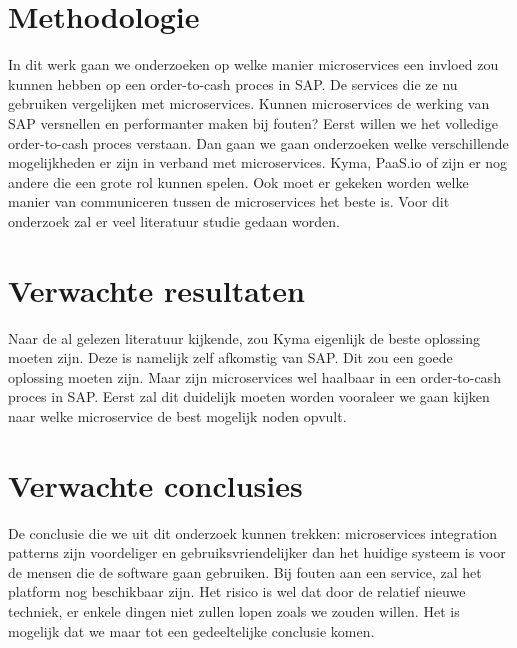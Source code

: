 
\section{Methodologie}
\label{sec:methodologie}
In dit werk gaan we onderzoeken op welke manier microservices een invloed zou kunnen hebben op een order-to-cash proces in SAP. De services die ze nu gebruiken vergelijken met microservices. Kunnen microservices de werking van SAP versnellen en performanter maken bij fouten?
Eerst willen we het volledige order-to-cash proces verstaan. Dan gaan we gaan onderzoeken welke verschillende mogelijkheden er zijn in verband met microservices. Kyma, PaaS.io of zijn er nog andere die een grote rol kunnen spelen. Ook moet er gekeken worden welke manier van communiceren tussen de microservices het beste is. Voor dit onderzoek zal er veel literatuur studie gedaan worden. 


\section{Verwachte resultaten}
\label{sec:verwachte_resultaten}
Naar de al gelezen literatuur kijkende, zou Kyma eigenlijk de beste oplossing moeten zijn. Deze is namelijk zelf afkomstig van SAP. Dit zou een goede oplossing moeten zijn. Maar zijn microservices wel haalbaar in een order-to-cash proces in SAP. Eerst zal dit duidelijk moeten worden vooraleer we gaan kijken naar welke microservice de best mogelijk noden opvult. 


\section{Verwachte conclusies}
\label{sec:verwachte_conclusies}

De conclusie die we uit dit onderzoek  kunnen trekken: microservices integration patterns zijn voordeliger en gebruiksvriendelijker dan het huidige systeem is voor de mensen die de software gaan gebruiken. Bij fouten aan een service, zal het platform nog beschikbaar zijn. Het risico is wel dat door de relatief nieuwe techniek, er enkele dingen niet zullen lopen zoals we zouden willen. Het is mogelijk dat we maar tot een gedeeltelijke conclusie komen.

